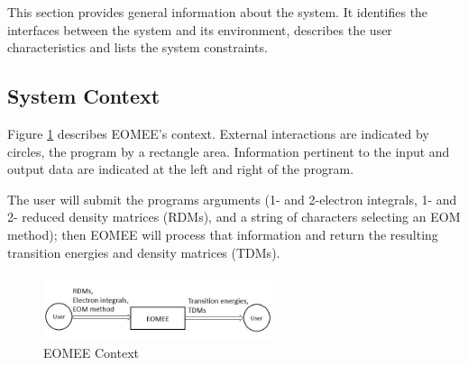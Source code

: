\documentclass[12pt]{article}
\begin{document}
This section provides general information about the system.  It identifies the
interfaces between the system and its environment, describes the user
characteristics and lists the system constraints. 
%

\subsection{System Context}


Figure \ref{Fig_SystemContext} describes EOMEE's context. 
External interactions are indicated by circles, the program by a rectangle 
area. Information pertinent to the input and output data are indicated at the 
left and right of the program.

\noindent The user will submit the programs arguments (1- and 2-electron 
integrals, 1- and 2- reduced density matrices (RDMs), and a string of 
characters selecting an EOM 
method); then EOMEE will process that information and return the resulting 
transition energies and density matrices (TDMs). 

\begin{figure}[h!]
	\begin{center}
		\includegraphics[width=0.6\textwidth]{systemcontext}
		\caption{EOMEE Context}
		\label{Fig_SystemContext} 
	\end{center}
\end{figure}
\end{document}
